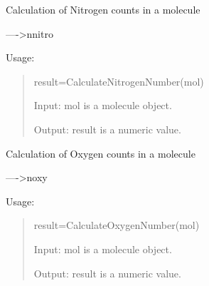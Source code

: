 \documentclass[letterpaper,10pt,english]{sphinxmanual}
\begin{document}

\begin{fulllineitems}
\label{reference/constitution:constitution.CalculateNitrogenNumber}
Calculation of Nitrogen counts in a molecule

----\textgreater{}nnitro

Usage:
\begin{quote}

result=CalculateNitrogenNumber(mol)

Input: mol is a molecule object.

Output: result is a numeric value.
\end{quote}

\end{fulllineitems}


\begin{fulllineitems}
\label{reference/constitution:constitution.CalculateOxygenNumber}
Calculation of Oxygen counts in a molecule

----\textgreater{}noxy

Usage:
\begin{quote}

result=CalculateOxygenNumber(mol)

Input: mol is a molecule object.

Output: result is a numeric value.
\end{quote}

\end{fulllineitems}


\begin{fulllineitems}
\label{reference/constitution:constitution.CalculatePath1}
\end{fulllineitems}


\begin{fulllineitems}
\label{reference/constitution:constitution.CalculatePath2}
\end{fulllineitems}
\end{document}
